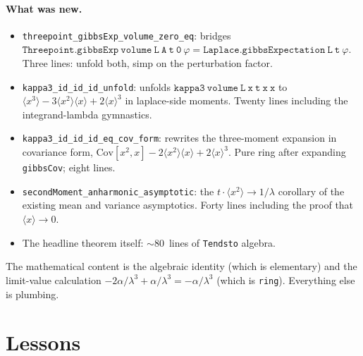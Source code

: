 \documentclass[11pt]{article}
\begin{document}
\paragraph{What was new.}
\begin{itemize}
\item \texttt{threepoint\_gibbsExp\_volume\_zero\_eq}: bridges
$\mathtt{Threepoint.gibbsExp\ volume\ L\ A\ t\ 0\ \varphi}
= \mathtt{Laplace.gibbsExpectation\ L\ t\ \varphi}$. Three lines:
unfold both, simp on the perturbation factor.
\item \texttt{kappa3\_id\_id\_id\_unfold}: unfolds
$\mathtt{kappa3\ volume\ L\ x\ t\ x\ x}$ to
$\langle x^3 \rangle - 3 \langle x^2 \rangle \langle x \rangle + 2 \langle x \rangle^3$
in laplace-side moments. Twenty lines including the integrand-lambda
gymnastics.
\item \texttt{kappa3\_id\_id\_id\_eq\_cov\_form}: rewrites the
three-moment expansion in covariance form,
$\mathrm{Cov}[x^2, x] - 2 \langle x^2 \rangle \langle x \rangle + 2 \langle x \rangle^3$.
Pure ring after expanding \texttt{gibbsCov}; eight lines.
\item \texttt{secondMoment\_anharmonic\_asymptotic}: the
$t \cdot \langle x^2 \rangle \to 1/\lambda$ corollary of the existing
mean and variance asymptotics. Forty lines including the proof that
$\langle x \rangle \to 0$.
\item The headline theorem itself: $\sim$80~lines of \texttt{Tendsto}
algebra.
\end{itemize}

The mathematical content is the algebraic identity (which is
elementary) and the limit-value calculation
$-2\alpha/\lambda^3 + \alpha/\lambda^3 = -\alpha/\lambda^3$ (which is
\texttt{ring}). Everything else is plumbing.

\section{Lessons}
\end{document}
